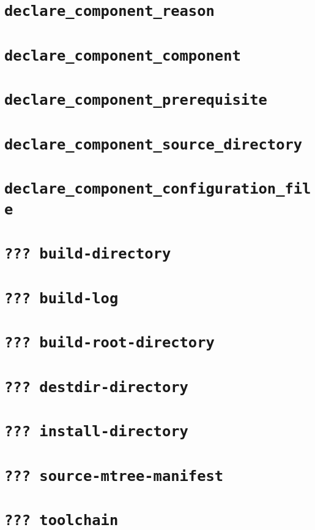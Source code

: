 \section{\texttt{declare\_component\_reason}}\label{api:reason}
\section{\texttt{declare\_component\_component}}\label{api:component}
\section{\texttt{declare\_component\_prerequisite}}\label{api:prerequisite}
\section{\texttt{declare\_component\_source\_directory}}\label{api:source-directory}
\section{\texttt{declare\_component\_configuration\_file}}\label{api:configuration-file}
\section{\texttt{??? build-directory}}\label{api:build-directory}
\section{\texttt{??? build-log}}\label{api:build-log}
\section{\texttt{??? build-root-directory}}\label{api:build-root-directory}
\section{\texttt{??? destdir-directory}}\label{api:destdir-directory}
\section{\texttt{??? install-directory}}\label{api:install-directory}
\section{\texttt{??? source-mtree-manifest}}\label{api:source-mtree-manifest}
\section{\texttt{??? toolchain}}\label{api:toolchain}
